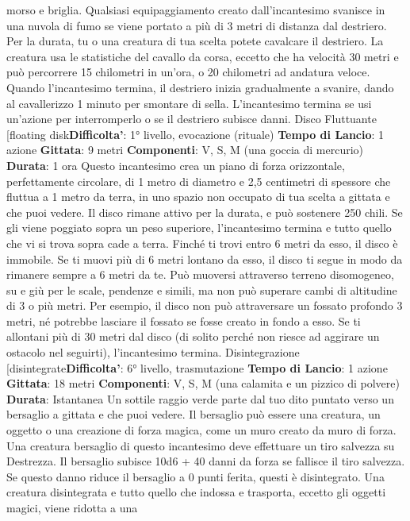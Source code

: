 \begin{multicols}{2}
morso e briglia. Qualsiasi equipaggiamento creato
dall’incantesimo svanisce in una nuvola di fumo se
viene portato a più di 3 metri di distanza dal destriero.
Per la durata, tu o una creatura di tua scelta potete
cavalcare il destriero. La creatura usa le statistiche del
cavallo da corsa, eccetto che ha velocità 30 metri e può
percorrere 15 chilometri in un’ora, o 20 chilometri ad
andatura veloce. Quando l’incantesimo termina, il
destriero inizia gradualmente a svanire, dando al
cavallerizzo 1 minuto per smontare di sella.
L’incantesimo termina se usi un’azione per
interromperlo o se il destriero subisce danni.
Disco Fluttuante
[floating disk\textbf{Difficolta'}:
1° livello, evocazione (rituale)
\textbf{Tempo di Lancio}: 1 azione
\textbf{Gittata}: 9 metri
\textbf{Componenti}: V, S, M (una goccia di mercurio)
\textbf{Durata}: 1 ora
Questo incantesimo crea un piano di forza orizzontale,
perfettamente circolare, di 1 metro di diametro e 2,5
centimetri di spessore che fluttua a 1 metro da terra, in
uno spazio non occupato di tua scelta a gittata e che
puoi vedere. Il disco rimane attivo per la durata, e può
sostenere 250 chili. Se gli viene poggiato sopra un peso
superiore, l’incantesimo termina e tutto quello che vi si
trova sopra cade a terra.
Finché ti trovi entro 6 metri da esso, il disco è immobile.
Se ti muovi più di 6 metri lontano da esso, il disco ti
segue in modo da rimanere sempre a 6 metri da te. Può
muoversi attraverso terreno disomogeneo, su e giù per
le scale, pendenze e simili, ma non può superare cambi
di altitudine di 3 o più metri. Per esempio, il disco non
può attraversare un fossato profondo 3 metri, né
potrebbe lasciare il fossato se fosse creato in fondo a
esso.
Se ti allontani più di 30 metri dal disco (di solito perché
non riesce ad aggirare un ostacolo nel seguirti),
l’incantesimo termina.
Disintegrazione
[disintegrate\textbf{Difficolta'}:
6° livello, trasmutazione
\textbf{Tempo di Lancio}: 1 azione
\textbf{Gittata}: 18 metri
\textbf{Componenti}: V, S, M (una calamita e un pizzico di
polvere)
\textbf{Durata}: Istantanea
Un sottile raggio verde parte dal tuo dito puntato verso
un bersaglio a gittata e che puoi vedere. Il bersaglio
può essere una creatura, un oggetto o una creazione di
forza magica, come un muro creato da muro di forza.
Una creatura bersaglio di questo incantesimo deve
effettuare un tiro salvezza su Destrezza. Il bersaglio
subisce 10d6 + 40 danni da forza se fallisce il tiro
salvezza. Se questo danno riduce il bersaglio a 0 punti
ferita, questi è disintegrato.
Una creatura disintegrata e tutto quello che indossa e
trasporta, eccetto gli oggetti magici, viene ridotta a una

\end{multicols}
